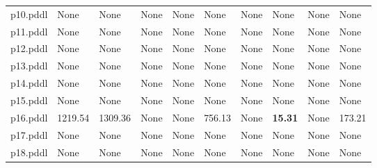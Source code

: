 \documentclass{article}
\begin{document}
\begin{tabular}{@{}lrrrrrrrrr@{}}
p10.pddl & \multicolumn{1}{|l|}{None} & \multicolumn{1}{|l|}{None} & \multicolumn{1}{|l|}{None} & \multicolumn{1}{|l|}{None} & \multicolumn{1}{|l|}{None} & \multicolumn{1}{|l|}{None} & \multicolumn{1}{|l|}{None} & \multicolumn{1}{|l|}{None} & \multicolumn{1}{|l|}{None} \\
p11.pddl & \multicolumn{1}{|l|}{None} & \multicolumn{1}{|l|}{None} & \multicolumn{1}{|l|}{None} & \multicolumn{1}{|l|}{None} & \multicolumn{1}{|l|}{None} & \multicolumn{1}{|l|}{None} & \multicolumn{1}{|l|}{None} & \multicolumn{1}{|l|}{None} & \multicolumn{1}{|l|}{None} \\
p12.pddl & \multicolumn{1}{|l|}{None} & \multicolumn{1}{|l|}{None} & \multicolumn{1}{|l|}{None} & \multicolumn{1}{|l|}{None} & \multicolumn{1}{|l|}{None} & \multicolumn{1}{|l|}{None} & \multicolumn{1}{|l|}{None} & \multicolumn{1}{|l|}{None} & \multicolumn{1}{|l|}{None} \\
p13.pddl & \multicolumn{1}{|l|}{None} & \multicolumn{1}{|l|}{None} & \multicolumn{1}{|l|}{None} & \multicolumn{1}{|l|}{None} & \multicolumn{1}{|l|}{None} & \multicolumn{1}{|l|}{None} & \multicolumn{1}{|l|}{None} & \multicolumn{1}{|l|}{None} & \multicolumn{1}{|l|}{None} \\
p14.pddl & \multicolumn{1}{|l|}{None} & \multicolumn{1}{|l|}{None} & \multicolumn{1}{|l|}{None} & \multicolumn{1}{|l|}{None} & \multicolumn{1}{|l|}{None} & \multicolumn{1}{|l|}{None} & \multicolumn{1}{|l|}{None} & \multicolumn{1}{|l|}{None} & \multicolumn{1}{|l|}{None} \\
p15.pddl & \multicolumn{1}{|l|}{None} & \multicolumn{1}{|l|}{None} & \multicolumn{1}{|l|}{None} & \multicolumn{1}{|l|}{None} & \multicolumn{1}{|l|}{None} & \multicolumn{1}{|l|}{None} & \multicolumn{1}{|l|}{None} & \multicolumn{1}{|l|}{None} & \multicolumn{1}{|l|}{None} \\
p16.pddl & 1219.54 & 1309.36 & \multicolumn{1}{|l|}{None} & \multicolumn{1}{|l|}{None} & 756.13 & \multicolumn{1}{|l|}{None} & \textbf{15.31} & \multicolumn{1}{|l|}{None} & 173.21 \\
p17.pddl & \multicolumn{1}{|l|}{None} & \multicolumn{1}{|l|}{None} & \multicolumn{1}{|l|}{None} & \multicolumn{1}{|l|}{None} & \multicolumn{1}{|l|}{None} & \multicolumn{1}{|l|}{None} & \multicolumn{1}{|l|}{None} & \multicolumn{1}{|l|}{None} & \multicolumn{1}{|l|}{None} \\
p18.pddl & \multicolumn{1}{|l|}{None} & \multicolumn{1}{|l|}{None} & \multicolumn{1}{|l|}{None} & \multicolumn{1}{|l|}{None} & \multicolumn{1}{|l|}{None} & \multicolumn{1}{|l|}{None} & \multicolumn{1}{|l|}{None} & \multicolumn{1}{|l|}{None} & \multicolumn{1}{|l|}{None} \\

\end{tabular}
\end{document}
